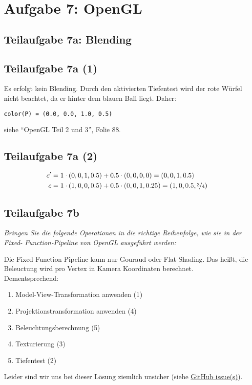 \documentclass[a4paper]{scrartcl}
\begin{document}
\section*{Aufgabe 7: OpenGL}
\subsection*{Teilaufgabe 7a: Blending}
\subsection*{Teilaufgabe 7a (1)}

Es erfolgt kein Blending. Durch den aktivierten Tiefentest wird der rote Würfel
nicht beachtet, da er hinter dem blauen Ball liegt. Daher:

\texttt{color(P) = (0.0, 0.0, 1.0, 0.5)}

siehe \enquote{OpenGL Teil 2 und 3}, Folie 88.

\subsection*{Teilaufgabe 7a (2)}
\begin{align}
    c' &= 1 \cdot (0,0,1,0.5) + 0.5 \cdot (0,0,0,0) = (0,0,1,0.5)\\
    c  &= 1 \cdot (1,0,0,0.5) + 0.5 \cdot (0,0,1,0.25) = (1,0,0.5, \nicefrac{3}{4})
\end{align}

\subsection*{Teilaufgabe 7b}
\textit{Bringen Sie die folgende Operationen in die richtige Reihenfolge, wie sie in der Fixed-
Function-Pipeline von OpenGL ausgeführt werden:}

Die Fixed Function Pipeline kann nur Gouraud oder Flat Shading. Das heißt, die
Beleuctung wird pro Vertex in Kamera Koordinaten berechnet. Dementsprechend:
\begin{enumerate}
    \item Model-View-Transformation anwenden (1)
    \item Projektionstransformation anwenden (4)
    \item Beleuchtungsberechnung (5)
    \item Texturierung (3)
    \item Tiefentest (2)
\end{enumerate}

Leider sind wir uns bei dieser Lösung ziemlich unsicher (siehe \href{https://github.com/MartinThoma/KIT-Musterloesungen/issues/22}{GitHub issue(s)}).
\end{document}
